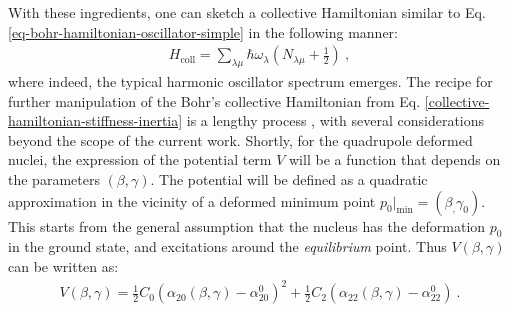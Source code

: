 With these ingredients, one can sketch a collective Hamiltonian similar to Eq. \ref{eq-bohr-hamiltonian-oscillator-simple} in the following manner:
\begin{align}
    H_\text{coll}=\sum_{\lambda\mu}\hbar\omega_\lambda\left(N_{\lambda\mu}+\frac{1}{2}\right)\ ,
\end{align}
where indeed, the typical harmonic oscillator spectrum emerges. The recipe for further manipulation of the Bohr's collective Hamiltonian from Eq. \ref{collective-hamiltonian-stiffness-inertia} is a lengthy process \cite{bohr1998nuclear,ring2004nuclear}, with several considerations beyond the scope of the current work. Shortly, for the quadrupole deformed nuclei, the expression of the potential term $V$ will be a function that depends on the parameters $(\beta,\gamma)$. The potential will be defined as a quadratic approximation in the vicinity of a deformed minimum point $p_0|_\text{min}=(\beta_,\gamma_0)$. This starts from the general assumption that the nucleus has the deformation $p_0$ in the ground state, and excitations around the \emph{equilibrium} point. Thus $V(\beta,\gamma)$ can be written as:
\begin{align}
    V(\beta,\gamma)=\frac{1}{2}C_{0}\left(\alpha_{20}(\beta,\gamma)-\alpha_{20}^0\right)^2+\frac{1}{2}C_{2}\left(\alpha_{22}(\beta,\gamma)-\alpha_{22}^0\right)\ .
    \label{bohr-collective-potential}
\end{align}

